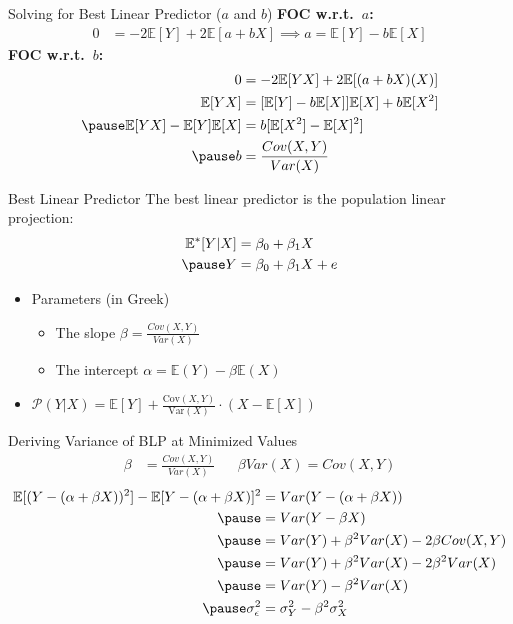 \documentclass[aspectratio=169, handout, t]{beamer}
\numberwithin{equation}{section}
\begin{document}
\begin{frame}{Solving for Best Linear Predictor ($a$ and $b$)}
\textbf{FOC w.r.t.\ $a$:}\pause
\begin{align*}
0&=  -2 \mathbb{E}[Y]+2 \mathbb{E}[a+bX] \implies a= \mathbb{E}[Y]-b \mathbb{E}[X]
\end{align*}
\pause
\textbf{FOC w.r.t.\ $b$:}\pause
\begin{align*}
0&= -2 \mathbb{E}[YX]+2 \mathbb{E}[(a+bX)(X)]\\
 \mathbb{E}[YX]&= [ \mathbb{E}[Y]-b \mathbb{E}[X]] \mathbb{E}[X]+b \mathbb{E}[X^2]\\\pause
 \mathbb{E}[YX]- \mathbb{E}[Y]\mathbb{E}[X]&= b[ \mathbb{E}[X^2]- \mathbb{E}[X]^2]\\\pause
b&=\frac{Cov(X,Y)}{Var(X)}\\
\end{align*}
\end{frame}


\begin{frame}{Best Linear Predictor}
The best linear predictor is the population linear projection:
\begin{align*}
 \mathbb{E}^{*}[Y|X]&=\beta_0+\beta_1X\\ \pause
Y&=\beta_0+\beta_1X+e
\end{align*}
\pause
\begin{itemize}
\item Parameters (in Greek)
\begin{itemize}
\item The slope $\beta =\frac{Cov(X,Y)}{Var(X)}$
\item The intercept $\alpha=\mathbb{E}(Y)-\beta \mathbb{E}(X)$
\end{itemize}
\item $\mathcal{P}(Y|X)= \mathbb{E}[Y]+\frac{\text{Cov}(X,Y)}{\text{Var}(X)}\cdot(X-\mathbb{E}[X])$
\end{itemize}
\end{frame}




\begin{frame}{Deriving Variance of BLP at Minimized Values}
\begin{align*}
\beta &=\frac{Cov(X,Y)}{Var(X)}&&  \beta Var(X)=Cov(X,Y)
\end{align*}  \pause
\begin{align*}
\mathbb{E}[(Y-(\alpha+\beta X))^2]-\mathbb{E}[Y-(\alpha+\beta X)]^2 &=Var(Y-(\alpha+\beta X))\\\pause
&=Var(Y-\beta X)\\\pause
&=Var(Y)+\beta^2Var(X)-2\beta Cov(X,Y)\\\pause
 &=Var(Y)+\beta^2Var(X)-2\beta^2 Var(X)\\\pause
  &=Var(Y)-\beta^2 Var(X)\\\pause
  \sigma^2_\epsilon  &=\sigma^2_Y-\beta^2 \sigma^2_X\\
\end{align*}
\end{frame}
\end{document}
